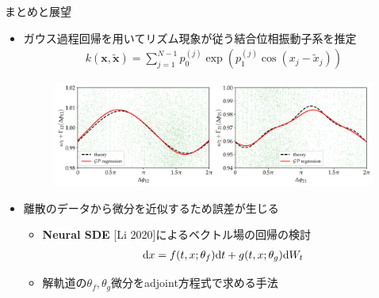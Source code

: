 \begin{frame}{まとめと展望}
  \begin{itemize}
    \item ガウス過程回帰を用いてリズム現象が従う結合位相振動子系を推定
    \begin{align*}
      k(\bm{x},\tilde{\bm{x}})=\sum_{j=1}^{N-1}p_{0}^{(j)}\exp(p_{1}^{(j)}\cos(x_{j}-\tilde{x}_{j}))
    \end{align*}
    \begin{figure}
      \includegraphics[height=0.3\textheight]{code/vdp_20221121/fig20221121/exp01case01.pdf}
    \end{figure}
    \item 離散のデータから微分を近似するため誤差が生じる
    \begin{itemize}
      \item \textbf{Neural SDE} [Li 2020]によるベクトル場の回帰の検討 %
      \begin{align*}
        \mathrm{d} x=f(t,x;\theta_{f})\mathrm{d} t+g(t,x;\theta_{g})\mathrm{d} W_{t}
      \end{align*}
      \item 解軌道の$\theta_{f},\theta_{g}$微分をadjoint方程式で求める手法
    \end{itemize}
  \end{itemize}
\end{frame}